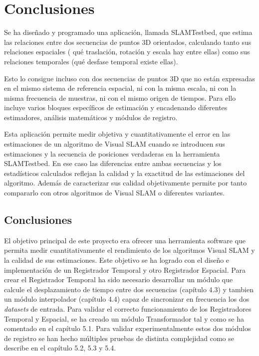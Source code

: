 \newpage

\chapter{Conclusiones} \label{cap:conclusiones}

Se ha diseñado y programado una aplicación, llamada SLAMTestbed, que estima las relaciones entre dos secuencias de puntos 3D orientados, calculando tanto sus relaciones espaciales ( qué traslación, rotación y escala hay entre ellas) como sus relaciones temporales (qué desfase temporal existe ellas).

Esto lo consigue incluso con dos secuencias de puntos 3D que no están expresadas en el mismo sistema de referencia espacial, ni con la misma escala, ni con la misma frecuencia de muestras, ni con el mismo origen de tiempos. Para ello incluye varios bloques específicos de estimación y encadenando diferentes estimadores, análisis matemáticos y módulos de registro.

Esta aplicación permite medir objetiva y cuantitativamente el error en las estimaciones de un algoritmo de Visual SLAM cuando se introducen sus estimaciones y la secuencia de posiciones verdaderas en la herramienta SLAMTestbed. En ese caso las diferencias entre ambas secuencias y los estadísticos calculados reflejan la calidad y la exactitud de las estimaciones del algoritmo.
Además de caracterizar sus calidad objetivamente permite por tanto compararlo con otros algoritmos de Visual SLAM o diferentes variantes.


\section{Conclusiones}

El objetivo principal de este proyecto era ofrecer una herramienta software que permita medir cuantitativamente el rendimiento de los algoritmos Visual SLAM y la calidad de sus estimaciones.
Este objetivo se ha logrado con el diseño e implementación de un Registrador Temporal y otro Registrador Espacial. 
Para crear el Registrador Temporal ha sido necesario desarrollar un módulo que calcule el desplazamiento de tiempo entre dos secuencias (capítulo 4.3) y tambien un módulo interpolador (capítulo 4.4) capaz de sincronizar en frecuencia los dos \textit{datasets} de entrada. Para validar el correcto funcionamiento de los Registradores Temporal y Espacial, se ha creado un módulo Transformador tal y como se ha comentado en el capítulo 5.1.
Para validar experimentalmente estos dos módulos de registro se han hecho múltiples pruebas de distinta complejidad como se describe en el capítulo 5.2, 5.3 y 5.4.

